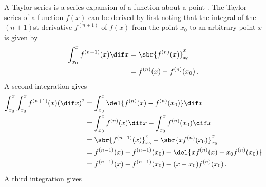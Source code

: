A Taylor series is a series expansion of a function about a point \parencite{Weisstein2017}.
The Taylor series of a function $f(x)$ can be derived by first noting that the integral of the $(n+1)$st derivative $f^{(n+1)}$ of $f(x)$ from the point $x_0$ to an arbitrary point $x$ is given by
\begin{align*}
  \int_{x_0}^x{f^{(n+1)}(x)}\dif x &= \sbr{ f^{(n)}(x) }_{x_0}^x \\
                               &= f^{(n)}(x) - f^{(n)}(x_0) \, .
\end{align*}
A second integration gives
\begin{align*}
  \int_{x_0}^x\int_{x_0}^x{f^{(n+1)}(x)} (\dif x)^2 &= \int_{x_0}^x{\del{ f^{(n)}(x) - f^{(n)}(x_0) }}\dif x \\
                                    &= \int_{x_0}^x{f^{(n)}(x)}\dif x - \int_{x_0}^x{f^{(n)}(x_0)}\dif x \\
                                    &= \sbr{ f^{(n-1)}(x) }_{x_0}^x - \sbr{ x f^{(n)}(x_0) }_{x_0}^x \\
                                    &= f^{(n-1)}(x) - f^{(n-1)}(x_0) - \del{ x f^{(n)}(x) - x_0 f^{(n)}(x_0) } \\
                                    &= f^{(n-1)}(x) - f^{(n-1)}(x_0) - (x - x_0) f^{(n)}(x_0) \, .
\end{align*}
A third integration gives

